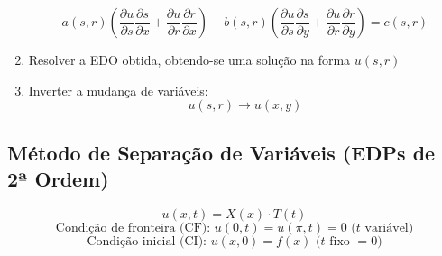 \documentclass[11pt, a4paper]{article}
\begin{document}
\begin{enumerate}
        \begin{equation*}
            a(s,r)\left(\frac{\partial u}{\partial s} 
            \frac{\partial s}{\partial x} + 
            \frac{\partial u}{\partial r} \frac{\partial r}{\partial x}\right) + 
            b(s,r)\left(\frac{\partial u}{\partial s} 
            \frac{\partial s}{\partial y} + 
            \frac{\partial u}{\partial r} \frac{\partial r}{\partial y}\right) =
            c(s,r)
        \end{equation*}
    \item Resolver a EDO obtida, obtendo-se uma solução na forma $u(s, r)$
    \item Inverter a mudança de variáveis:
    \begin{equation*}
        u(s, r) \rightarrow u(x, y)
    \end{equation*}
\end{enumerate}

\newpage

\subsection{Método de Separação de Variáveis (EDPs de 2ª Ordem)}

\begin{equation*}
    u(x, t) = X(x) \cdot T(t)
\end{equation*}
\begin{equation*}
    \text{Condição de fronteira (CF):\ \ } u(0, t) = u(\pi, t) = 0 \text{\ \ ($t$ variável)}
\end{equation*}
\begin{equation*}
    \text{Condição inicial (CI):\ \ } u(x, 0) = f(x) \text{\ \ ($t$ fixo $= 0$)}
\end{equation*}
\end{document}
